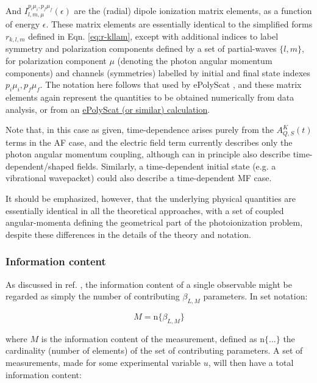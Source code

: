 \documentclass[10pt]{article}
\begin{document}
And \(I_{l,m,\mu}^{p_{i}\mu_{i},p_{f}\mu_{f}}(\epsilon)\) are the (radial) dipole ionization matrix elements, as a function of energy \(\epsilon\). These matrix elements are essentially identical to the simplified forms $r_{k,l,m}$ defined in Eqn. \ref{eq:r-kllam}, except with additional indices to label symmetry and polarization components
defined by a set of partial-waves \(\{l,m\}\), for polarization component \(\mu\) (denoting the photon angular momentum components) and channels (symmetries) labelled by initial and final state indexes \({p_{i}\mu_{i},p_{f}\mu_{f}}\). The notation here follows that used by ePolyScat \cite{Gianturco1994, Lucchese1986, Natalense1999}, and these matrix elements again represent the quantities  to be obtained numerically from data analysis, or from an \href{https://epsproc.readthedocs.io/en/latest/ePS_ePSproc_tutorial/ePS_tutorial_080520.html\#Theoretical-background}{ePolyScat (or similar) calculation}. 

Note that, in this case as given, time-dependence arises purely from the \(A_{Q,S}^{K}(t)\) terms in the AF case, and the electric field term currently describes only the photon angular momentum coupling,
although can in principle also describe time-dependent/shaped fields. Similarly, a time-dependent initial state (e.g. a vibrational wavepacket) could also describe a time-dependent MF case.

It should be emphasized, however, that the underlying physical quantities are essentially identical in all the theoretical approaches, with a set of coupled angular-momenta defining the geometrical part of the photoionization problem, despite these differences in the details of the theory and notation. 




\subsubsection{Information content\label{sec:info-content}}

As discussed in ref. \cite{hockett2018QMP2}, the information content of a single observable might be regarded as simply the number of contributing $\beta_{L,M}$ parameters. In set notation:

\begin{equation}
M=\mathrm{n}\{\beta_{L,M}\}
\end{equation}

where $M$ is the information content of the measurement, defined
as $\mathrm{n}\{...\}$ the cardinality (number of elements) of the
set of contributing parameters. A set of measurements, made for some
experimental variable $u$, will then have a total information content:
\end{document}

